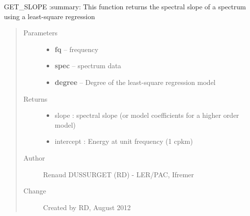 \documentclass[letterpaper,10pt,english]{sphinxmanual}
\begin{document}
\begin{fulllineitems}
\label{altimetry.tools.spectrum:altimetry.tools.spectrum.get_slope}
GET\_SLOPE
:summary: This function returns the spectral slope of a spectrum using a least-square regression
\begin{quote}\begin{description}
\item[{Parameters}] \leavevmode\begin{itemize}
\item {} 
\textbf{fq} -- frequency

\item {} 
\textbf{spec} -- spectrum data

\item {} 
\textbf{degree} -- Degree of the least-square regression model

\end{itemize}

\item[{Returns}] \leavevmode
\begin{itemize}
\item {} 
slope : spectral slope (or model coefficients for a higher order model)

\item {} 
intercept : Energy at unit frequency (1 cpkm)

\end{itemize}


\item[{Author }] \leavevmode
Renaud DUSSURGET (RD) - LER/PAC, Ifremer

\item[{Change }] \leavevmode
Created by RD, August 2012

\end{description}\end{quote}

\end{fulllineitems}

\end{document}
